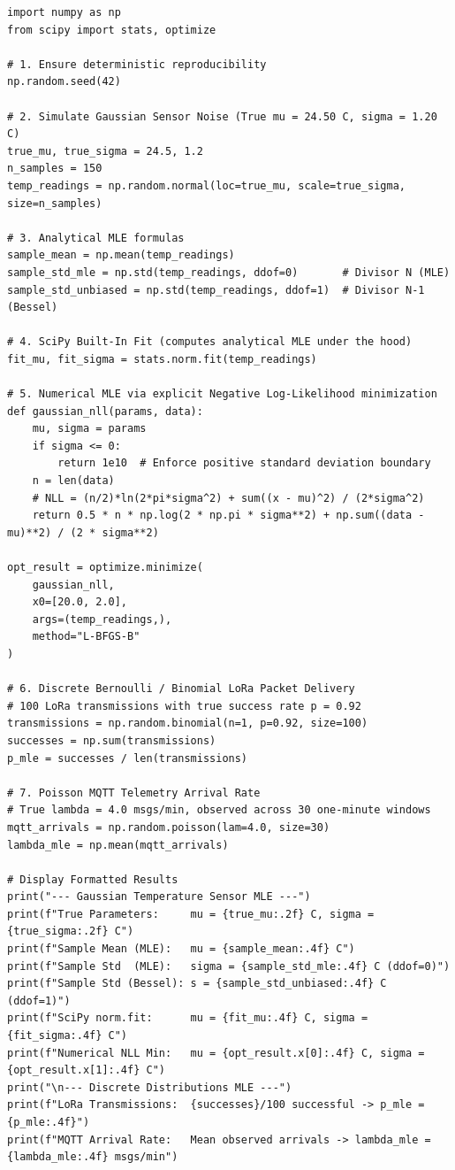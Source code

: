 \begin{lstlisting}[style=pythonstyle]
import numpy as np
from scipy import stats, optimize

# 1. Ensure deterministic reproducibility
np.random.seed(42)

# 2. Simulate Gaussian Sensor Noise (True mu = 24.50 C, sigma = 1.20 C)
true_mu, true_sigma = 24.5, 1.2
n_samples = 150
temp_readings = np.random.normal(loc=true_mu, scale=true_sigma, size=n_samples)

# 3. Analytical MLE formulas
sample_mean = np.mean(temp_readings)
sample_std_mle = np.std(temp_readings, ddof=0)       # Divisor N (MLE)
sample_std_unbiased = np.std(temp_readings, ddof=1)  # Divisor N-1 (Bessel)

# 4. SciPy Built-In Fit (computes analytical MLE under the hood)
fit_mu, fit_sigma = stats.norm.fit(temp_readings)

# 5. Numerical MLE via explicit Negative Log-Likelihood minimization
def gaussian_nll(params, data):
    mu, sigma = params
    if sigma <= 0:
        return 1e10  # Enforce positive standard deviation boundary
    n = len(data)
    # NLL = (n/2)*ln(2*pi*sigma^2) + sum((x - mu)^2) / (2*sigma^2)
    return 0.5 * n * np.log(2 * np.pi * sigma**2) + np.sum((data - mu)**2) / (2 * sigma**2)

opt_result = optimize.minimize(
    gaussian_nll, 
    x0=[20.0, 2.0], 
    args=(temp_readings,), 
    method="L-BFGS-B"
)

# 6. Discrete Bernoulli / Binomial LoRa Packet Delivery
# 100 LoRa transmissions with true success rate p = 0.92
transmissions = np.random.binomial(n=1, p=0.92, size=100)
successes = np.sum(transmissions)
p_mle = successes / len(transmissions)

# 7. Poisson MQTT Telemetry Arrival Rate
# True lambda = 4.0 msgs/min, observed across 30 one-minute windows
mqtt_arrivals = np.random.poisson(lam=4.0, size=30)
lambda_mle = np.mean(mqtt_arrivals)

# Display Formatted Results
print("--- Gaussian Temperature Sensor MLE ---")
print(f"True Parameters:     mu = {true_mu:.2f} C, sigma = {true_sigma:.2f} C")
print(f"Sample Mean (MLE):   mu = {sample_mean:.4f} C")
print(f"Sample Std  (MLE):   sigma = {sample_std_mle:.4f} C (ddof=0)")
print(f"Sample Std (Bessel): s = {sample_std_unbiased:.4f} C (ddof=1)")
print(f"SciPy norm.fit:      mu = {fit_mu:.4f} C, sigma = {fit_sigma:.4f} C")
print(f"Numerical NLL Min:   mu = {opt_result.x[0]:.4f} C, sigma = {opt_result.x[1]:.4f} C")
print("\n--- Discrete Distributions MLE ---")
print(f"LoRa Transmissions:  {successes}/100 successful -> p_mle = {p_mle:.4f}")
print(f"MQTT Arrival Rate:   Mean observed arrivals -> lambda_mle = {lambda_mle:.4f} msgs/min")
\end{lstlisting}

